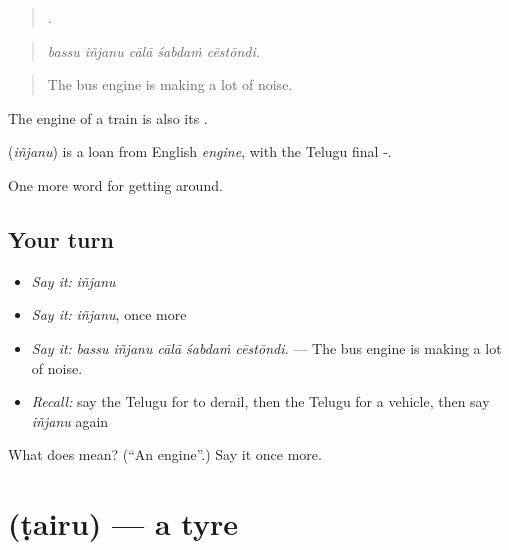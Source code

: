 \begin{quote}
    .
\end{quote}

\begin{quote}
\emph{bassu iñjanu cālā śabdaṁ cēstōndi.}
\end{quote}

\begin{quote}
The bus engine is making a lot of noise.
\end{quote}

The engine of a train is also its .

\begin{cousinweb}
\textbf{} (\emph{iñjanu}) is a loan from English \emph{engine}, with the Telugu final -.
\end{cousinweb}

\begin{grammarlens}[title={What you've built}]
One more word for getting around.
\end{grammarlens}

\subsection*{Your turn}
\begin{itemize}
\raggedright
  \item \emph{Say it:} \emph{iñjanu}
  \item \emph{Say it:} \emph{iñjanu}, once more
  \item \emph{Say it:} \emph{bassu iñjanu cālā śabdaṁ cēstōndi.} — The bus engine is making a lot of noise.
  \item \emph{Recall:} say the Telugu for to derail, then the Telugu for a vehicle, then say \emph{iñjanu} again
\end{itemize}

\begin{tcolorbox}[breakable,colback=teal!4,colframe=teal!35!black,title={Before you move on}]
What does  mean? (\textquotedblleft{}An engine\textquotedblright{}.) Say it once more.
\end{tcolorbox}
\section[\texorpdfstring{\te{టైరు} (ṭairu)}{టైరు (ṭairu)}]{ (ṭairu) — a tyre}

\label{lesson:TE-C443-tairu}



